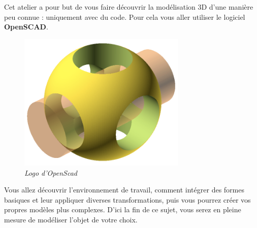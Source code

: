 Cet atelier a pour but de vous faire découvrir la modélisation 3D d'une manière peu connue : uniquement avec du code.
Pour cela vous aller utiliser le logiciel \textbf{OpenSCAD}.

\vspace{10pt}

\begin{figure}[h]
	\centering
	\includegraphics[width=8cm]{images/logo-openscad.png}
	\caption{\textit{Logo d'OpenScad}}
\end{figure}

\vspace{10pt}

Vous allez découvrir l'environnement de travail, comment intégrer des formes basiques et leur appliquer diverses transformations, puis vous pourrez créer vos propres modèles plus complexes.
D'ici la fin de ce sujet, vous serez en pleine mesure de modéliser l'objet de votre choix.